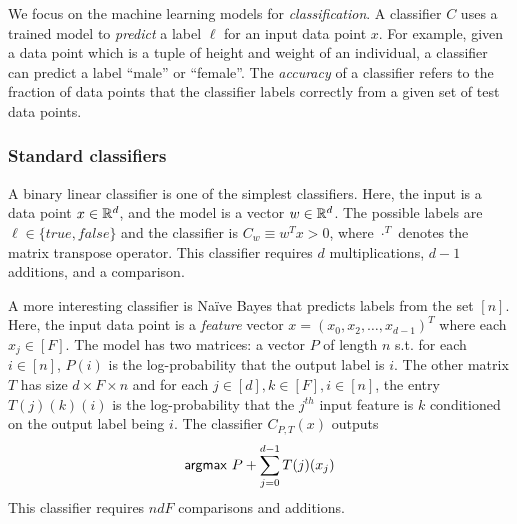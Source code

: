 We focus on the machine learning models for {\it classification}.
A classifier $C$ uses a trained model to {\it predict} a
label $\ell$ for an input data point $x$. For example, given a
data point which is a tuple of height and weight of an individual,
a classifier can predict a label ``male'' or ``female''. The {\it
  accuracy} of a classifier refers to the fraction of data points that
the classifier labels correctly from a given set of test data
points.

\subsubsection*{Standard classifiers}
A binary linear classifier is one of the simplest classifiers. Here,
the input is a data point $x\in{\mathbb{R}}^d$,
and the model is a vector $w\in{\mathbb{R}}^d$. The possible labels are
$\ell\in\{\mathit{true},\mathit{false}\}$ and the classifier is
$C_w\equiv w^Tx>0$, where $\cdot^T$ denotes the matrix transpose
operator. This classifier requires $d$ multiplications, $d-1$
additions, and a comparison.

A more interesting classifier is Na\"{i}ve Bayes that predicts labels
from the set $[n]$.
Here, the input data point is a {\it feature}
vector $x=(x_0,x_2,\ldots,x_{d-1})^T$ where each $x_j\in [F]$.
The model has two matrices: a vector $P$ of length $n$ s.t. for each
$i
\in [n]$, $P(i)$ is the log-probability that the output label is $i$.
The other matrix $T$ has size $d\times F\times n$ and for each $j\in
[d], k\in [F], i\in [n]$, the entry $T(j)(k)(i)$ is 
the log-probability that  the $j^{th}$ input feature is $k$  conditioned on  the output label being $i$.
The classifier $C_{P,T}(x)$ outputs
\[
{\sf argmax}\ P+\sum_{j=0}^{d-1} T(j)(x_j)
\]
This classifier requires $ndF$ comparisons and additions.  


